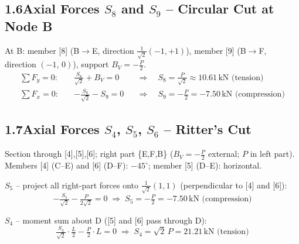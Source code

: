 \documentclass[a4paper,11pt]{article}
\begin{document}
\begin{center}
\end{center}


\subsection*{1.6\quad Axial Forces $S_8$ and $S_9$ -- Circular Cut at Node B}

At B: member [8] (B$\to$E, direction $\tfrac{1}{\sqrt{2}}(-1,+1)$),
member [9] (B$\to$F, direction $(-1,\,0)$), support $B_V = -\tfrac{P}{2}$.
\begin{align*}
  \sum F_y = 0:\quad & \tfrac{S_8}{\sqrt{2}} + B_V = 0
    &&\Rightarrow\quad \boxed{S_8 = \tfrac{P}{\sqrt{2}} \approx 10.61\,\text{kN (tension)}} \\
  \sum F_x = 0:\quad & -\tfrac{S_8}{\sqrt{2}} - S_9 = 0
    &&\Rightarrow\quad \boxed{S_9 = -\tfrac{P}{2} = -7.50\,\text{kN (compression)}}
\end{align*}

\subsection*{1.7\quad Axial Forces $S_4$, $S_5$, $S_6$ -- Ritter's Cut}

Section through [4],[5],[6]; right part \{E,F,B\} ($B_V = -\tfrac{P}{2}$ external; $P$ in left part).
Members [4] (C--E) and [6] (D--F): $-45^\circ$; member [5] (D--E): horizontal.

\textbf{$S_5$} -- project all right-part forces onto $\tfrac{1}{\sqrt{2}}(1,1)$
(perpendicular to [4] and [6]):
\[
  -\tfrac{S_5}{\sqrt{2}} - \tfrac{P}{2\sqrt{2}} = 0
  \;\Rightarrow\; \boxed{S_5 = -\tfrac{P}{2} = -7.50\,\text{kN (compression)}}
\]

\textbf{$S_4$} -- moment sum about D ([5] and [6] pass through D):
\[
  \tfrac{S_4}{\sqrt{2}}\cdot\tfrac{L}{2} - \tfrac{P}{2}\cdot L = 0
  \;\Rightarrow\; \boxed{S_4 = \sqrt{2}\,P = 21.21\,\text{kN (tension)}}
\]
\end{document}
